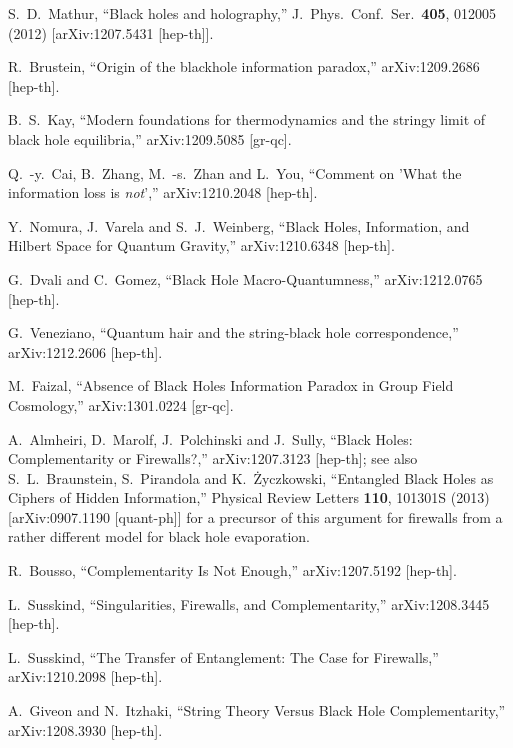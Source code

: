 \documentclass[12pt]{article}
\begin{document}
\begin{thebibliography}{99}
  S.~D.~Mathur,
  ``Black holes and holography,''
  J.\ Phys.\ Conf.\ Ser.\  {\bf 405}, 012005 (2012)
  [arXiv:1207.5431 [hep-th]].

  R.~Brustein,
  ``Origin of the blackhole information paradox,''
  arXiv:1209.2686 [hep-th].

  B.~S.~Kay,
  ``Modern foundations for thermodynamics and the stringy limit of black hole equilibria,''
  arXiv:1209.5085 [gr-qc].

  Q.~-y.~Cai, B.~Zhang, M.~-s.~Zhan and L.~You,
  ``Comment on 'What the information loss is {\it not}',''
  arXiv:1210.2048 [hep-th].

  Y.~Nomura, J.~Varela and S.~J.~Weinberg,
  ``Black Holes, Information, and Hilbert Space for Quantum Gravity,''
  arXiv:1210.6348 [hep-th].

  G.~Dvali and C.~Gomez,
  ``Black Hole Macro-Quantumness,''
  arXiv:1212.0765 [hep-th].

  G.~Veneziano,
  ``Quantum hair and the string-black hole correspondence,''
  arXiv:1212.2606 [hep-th].

  M.~Faizal,
  ``Absence of Black Holes Information Paradox in Group Field Cosmology,''
  arXiv:1301.0224 [gr-qc].

  A.~Almheiri, D.~Marolf, J.~Polchinski and J.~Sully,
  ``Black Holes: Complementarity or Firewalls?,''
  arXiv:1207.3123 [hep-th]; see also S.~L.~Braunstein, S.~Pirandola and K.~\.{Z}yczkowski,
  ``Entangled Black Holes as Ciphers of Hidden Information,''
  Physical Review Letters {\bf 110}, 101301S (2013)
  [arXiv:0907.1190 [quant-ph]] for a precursor of this argument for firewalls
  from a rather different model for black hole evaporation.
  
  R.~Bousso,
  ``Complementarity Is Not Enough,''
  arXiv:1207.5192 [hep-th].
  
  L.~Susskind,
  ``Singularities, Firewalls, and Complementarity,''
  arXiv:1208.3445 [hep-th]. 
  
  L.~Susskind,
  ``The Transfer of Entanglement: The Case for Firewalls,''
  arXiv:1210.2098 [hep-th]. 
  
  A.~Giveon and N.~Itzhaki,
  ``String Theory Versus Black Hole Complementarity,''
  arXiv:1208.3930 [hep-th].


\end{thebibliography}
\end{document}
